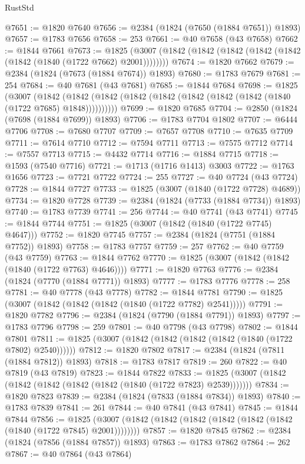 \begin{lexlean}{RustStd}
\begin{coremodule}
{\begin{coremodule}
{{{{{{{{{{{{{{{{{{{{{{{{{{{{{{{{{{{{{{{{{{{{{{{@7651 := @1820 @7640
@7656 := @2384 (@1824 (@7650 (@1884 @7651)) @1893)
@7657 := @1783 @7656
@7658 := 253
@7661 := @40 @7658 (@43 @7658)
@7662 := @1844 @7661
@7673 := @1825 (@3007 (@1842 (@1842 (@1842 (@1842 (@1842 (@1842 (@1840 (@1722 @7662) @2001))))))))
@7674 := @1820 @7662
@7679 := @2384 (@1824 (@7673 (@1884 @7674)) @1893)
@7680 := @1783 @7679
@7681 := 254
@7684 := @40 @7681 (@43 @7681)
@7685 := @1844 @7684
@7698 := @1825
    (@3007
      (@1842 (@1842 (@1842 (@1842 (@1842 (@1842 (@1842 (@1842 (@1840 (@1722 @7685) @1848))))))))))
@7699 := @1820 @7685
@7704 := @2850 (@1824 (@7698 (@1884 @7699)) @1893)
@7706 := @1783 @7704 @1802
@7707 := @6444 @7706
@7708 := @7680 @7707
@7709 := @7657 @7708
@7710 := @7635 @7709
@7711 := @7614 @7710
@7712 := @7594 @7711
@7713 := @7575 @7712
@7714 := @7557 @7713
@7715 := @4432 @7714
@7716 := @1884 @7715
@7718 := @1593 (@7540 @7716)
@7721 := @1713 (@1716 @1413) @3003
@7722 := @1763 @1656
@7723 := @7721 @7722
@7724 := 255
@7727 := @40 @7724 (@43 @7724)
@7728 := @1844 @7727
@7733 := @1825 (@3007 (@1840 (@1722 @7728) @4689))
@7734 := @1820 @7728
@7739 := @2384 (@1824 (@7733 (@1884 @7734)) @1893)
@7740 := @1783 @7739
@7741 := 256
@7744 := @40 @7741 (@43 @7741)
@7745 := @1844 @7744
@7751 := @1825 (@3007 (@1842 (@1840 (@1722 @7745) @4647)))
@7752 := @1820 @7745
@7757 := @2384 (@1824 (@7751 (@1884 @7752)) @1893)
@7758 := @1783 @7757
@7759 := 257
@7762 := @40 @7759 (@43 @7759)
@7763 := @1844 @7762
@7770 := @1825 (@3007 (@1842 (@1842 (@1840 (@1722 @7763) @4646))))
@7771 := @1820 @7763
@7776 := @2384 (@1824 (@7770 (@1884 @7771)) @1893)
@7777 := @1783 @7776
@7778 := 258
@7781 := @40 @7778 (@43 @7778)
@7782 := @1844 @7781
@7790 := @1825 (@3007 (@1842 (@1842 (@1842 (@1840 (@1722 @7782) @2541)))))
@7791 := @1820 @7782
@7796 := @2384 (@1824 (@7790 (@1884 @7791)) @1893)
@7797 := @1783 @7796
@7798 := 259
@7801 := @40 @7798 (@43 @7798)
@7802 := @1844 @7801
@7811 := @1825 (@3007 (@1842 (@1842 (@1842 (@1842 (@1840 (@1722 @7802) @2540))))))
@7812 := @1820 @7802
@7817 := @2384 (@1824 (@7811 (@1884 @7812)) @1893)
@7818 := @1783 @7817
@7819 := 260
@7822 := @40 @7819 (@43 @7819)
@7823 := @1844 @7822
@7833 := @1825 (@3007 (@1842 (@1842 (@1842 (@1842 (@1842 (@1840 (@1722 @7823) @2539)))))))
@7834 := @1820 @7823
@7839 := @2384 (@1824 (@7833 (@1884 @7834)) @1893)
@7840 := @1783 @7839
@7841 := 261
@7844 := @40 @7841 (@43 @7841)
@7845 := @1844 @7844
@7856 := @1825 (@3007 (@1842 (@1842 (@1842 (@1842 (@1842 (@1842 (@1840 (@1722 @7845) @2001))))))))
@7857 := @1820 @7845
@7862 := @2384 (@1824 (@7856 (@1884 @7857)) @1893)
@7863 := @1783 @7862
@7864 := 262
@7867 := @40 @7864 (@43 @7864)
}}}}}}}}}}}}}}}}}}}}}}}}}}}}}}}}}}}}}}}}}}}}}}}
\end{coremodule}}
\end{coremodule}
\end{lexlean}
